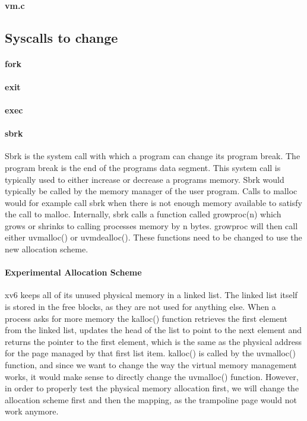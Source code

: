 \paragraph*{vm.c}
\subsection*{Syscalls to change}
\paragraph*{fork}
\paragraph*{exit}
\paragraph*{exec}
\paragraph*{sbrk}
Sbrk is the system call with which a program can change its program break. The program break
is the end of the programs data segment. This system call is typically used to either
increase or decrease a programs memory.
Sbrk would typically be called by the memory manager of the user program. Calls
to malloc would for example call sbrk when there is not enough memory available to
satisfy the call to malloc.
Internally, sbrk calls a function called growproc(n) which grows or shrinks to calling
processes memory by n bytes.
growproc will then call either uvmalloc() or uvmdealloc(). These functions need to be
changed to use the new allocation scheme.

\paragraph*{Experimental Allocation Scheme}
xv6 keeps all of its unused physical memory in a linked list. The linked list itself is stored
in the free blocks, as they are not used for anything else. When a process asks for more memory
the kalloc() function retrieves the first element from the linked list, updates the head
of the list to point to the next element and returns the pointer to the first element,
which is the same as the physical address for the page managed by that first list item.
kalloc() is called by the uvmalloc() function, and since we want to change the way
the virtual memory management works, it would make sense to directly change the uvmalloc() function.
However, in order to properly test the physical memory allocation first, we will change
the allocation scheme first and then the mapping, as the trampoline page would not work anymore.

